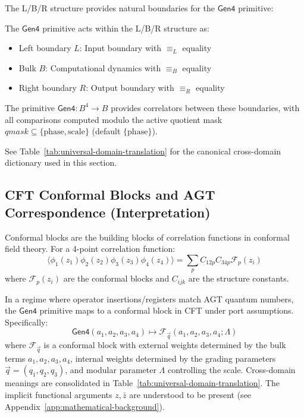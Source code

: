 The L/B/R structure provides natural boundaries for the $\mathsf{Gen4}$ primitive:

\begin{definition}
\label{def:lbr-boundary}
The $\mathsf{Gen4}$ primitive acts within the L/B/R structure as:
\begin{itemize}
\item Left boundary $L$: Input boundary with $\equiv_L$ equality
\item Bulk $B$: Computational dynamics with $\equiv_B$ equality  
\item Right boundary $R$: Output boundary with $\equiv_R$ equality
\end{itemize}
The primitive $\mathsf{Gen4} : B^4 \to B$ provides correlators between these boundaries, with all comparisons computed modulo the active quotient mask $qmask \subseteq \{\text{phase}, \text{scale}\}$ (default $\{\text{phase}\}$). 

See Table~\ref{tab:universal-domain-translation} for the canonical cross-domain dictionary used in this section.
\end{definition}

\subsection{CFT Conformal Blocks and AGT Correspondence (Interpretation)}

\begin{definition}
\label{def:conformal-blocks}
Conformal blocks are the building blocks of correlation functions in conformal field theory. For a 4-point correlation function:
\[
\langle \phi_1(z_1) \phi_2(z_2) \phi_3(z_3) \phi_4(z_4) \rangle = \sum_p C_{12p} C_{34p} \mathcal{F}_p(z_i)
\]
where $\mathcal{F}_p(z_i)$ are the conformal blocks and $C_{ijk}$ are the structure constants.
\end{definition}

\begin{proposition}
\label{thm:gen4-conformal}
In a regime where operator insertions/registers match AGT quantum numbers, the $\mathsf{Gen4}$ primitive maps to a conformal block in CFT under port assumptions. Specifically:
\[
\mathsf{Gen4}(a_1, a_2, a_3, a_4) \mapsto \mathcal{F}_{\vec{q}}(a_1, a_2, a_3, a_4; \Lambda)
\]
where $\mathcal{F}_{\vec{q}}$ is a conformal block with external weights determined by the bulk terms $a_1, a_2, a_3, a_4$, internal weights determined by the grading parameters $\vec{q} = (q_1,q_2,q_3)$, and modular parameter $\Lambda$ controlling the scale. Cross-domain meanings are consolidated in Table~\ref{tab:universal-domain-translation}. The implicit functional arguments $z, \bar{z}$ are understood to be present (see Appendix~\ref{app:mathematical-background}).
\end{proposition}

